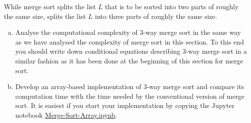 \exercise
While merge sort splits the list $L$ that is to be sorted into two parts of roughly the same size, 
 splits the list $L$ into three parts of roughly the same size.
\begin{enumerate}[(a)]
\item Analyse the computational complexity of 3-way merge sort in the same way as we have analysed the
      complexity of merge sort in this section.  To this end you should write down conditional equations
      describing 3-way merge sort in a similar fashion as it has been done at the beginning of this
      section for merge sort.
\item Develop an array-based implementation of 3-way merge sort and compare its computation time with the 
      time needed by the conventional version of merge sort.  It is easiest if you start your implementation
      by copying the Jupyter notebook \href{https://github.com/karlstroetmann/Algorithms/blob/master/Python/Chapter-04/Merge-Sort-Array.ipynb}{Merge-Sort-Array.ipynb}.
      \eox
\end{enumerate}

